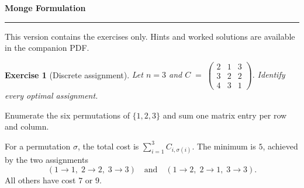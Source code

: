 \documentclass[11pt,a4paper]{article}
\theoremstyle{exostyle}
\newtheorem{exercise}{Exercise}
\newif\ifcorr
\renewcommand{\maketitle}{\thispagestyle{plain}\begingroup
  \color{heading}\LARGE\bfseries\SheetTitle\par\endgroup
  \vspace{3pt}{\large\ifcorr Statements, hints and worked solutions\else Exercise statements\fi}\par
  \vspace{7pt}\hrule\vspace{9pt}
  \ifcorr Each exercise is followed by question-by-question hints and a worked solution.
  Try the questions before reading the hints.\else
  This version contains the exercises only. Hints and worked solutions are available in the companion PDF.\fi
  \par\medskip}
\newcommand{\SheetTitle}{Monge Formulation}
\begin{document}
\maketitle

\begin{exercise}[Discrete assignment]\label{ex:assignment}
Let $n=3$ and
$
C \;=\;
\begin{pmatrix}
2 & 1 & 3\\
3 & 2 & 2\\
4 & 3 & 1
\end{pmatrix}.
$
Identify every optimal assignment.
\end{exercise}
\begin{hints}
Enumerate the six permutations of $\{1,2,3\}$ and sum one matrix entry per row and column.
\end{hints}
\begin{solution}
For a permutation $\sigma$, the total cost is $\sum_{i=1}^3 C_{i,\sigma(i)}$.
The minimum is $5$, achieved by the two assignments
\[
(1\!\to\!1,\;2\!\to\!2,\;3\!\to\!3)\quad\text{and}\quad
(1\!\to\!2,\;2\!\to\!1,\;3\!\to\!3).
\]
All others have cost $7$ or $9$.
\end{solution}
\end{document}

